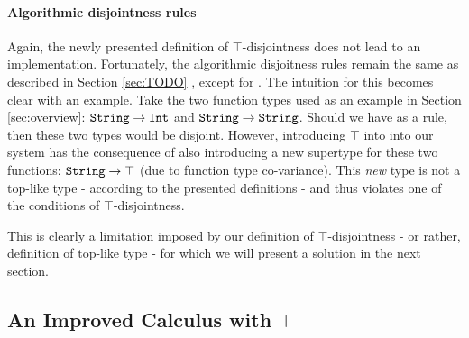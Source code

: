 


\paragraph{Algorithmic disjointness rules}

Again, the newly presented definition of $\top$-disjointness does not lead to an implementation. 
Fortunately, the algorithmic disjoitness rules remain the same as described in Section \ref{sec:TODO} 
, except for .
The intuition for this becomes clear with an example.
Take the two function types used as an example in Section \ref{sec:overview}: 
$\texttt{String} \to \texttt{Int}$ and $\texttt{String} \to \texttt{String}$. 
Should we have  as a rule, then these two types would be disjoint. 
However, introducing $\top$ into into our system has the consequence of also introducing a new supertype for these 
two functions: $\texttt{String} \to \top$ (due to function type co-variance). 
This \emph{new} type is not a top-like type - according to the presented definitions - and thus violates one of the
conditions of $\top$-disjointness.

This is clearly a limitation imposed by our definition of $\top$-disjointness - or rather, definition of top-like type - 
for which we will present a solution in the next section.

\subsection{An Improved Calculus with $\top$}

